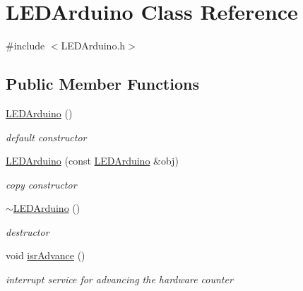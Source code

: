 \hypertarget{class_l_e_d_arduino}{}\section{L\+E\+D\+Arduino Class Reference}
\label{class_l_e_d_arduino}


{\ttfamily \#include $<$L\+E\+D\+Arduino.\+h$>$}

\subsection*{Public Member Functions}
\begin{DoxyCompactItemize}
\item 
\mbox{\label{class_l_e_d_arduino_a8f0a0b63342c171296c81f303787ccff}} 
\hyperlink{class_l_e_d_arduino_a8f0a0b63342c171296c81f303787ccff}{L\+E\+D\+Arduino} ()
\begin{DoxyCompactList}\small\item\em default constructor \end{DoxyCompactList}\item 
\hyperlink{class_l_e_d_arduino_a8ba91e5ee89fe89f9c1052f5619fc436}{L\+E\+D\+Arduino} (const \hyperlink{class_l_e_d_arduino}{L\+E\+D\+Arduino} \&obj)
\begin{DoxyCompactList}\small\item\em copy constructor \end{DoxyCompactList}\item 
\mbox{\label{class_l_e_d_arduino_a667ca90e4554f8efd6b050489a4b84c3}} 
\hyperlink{class_l_e_d_arduino_a667ca90e4554f8efd6b050489a4b84c3}{$\sim$\+L\+E\+D\+Arduino} ()
\begin{DoxyCompactList}\small\item\em destructor \end{DoxyCompactList}\item 
\mbox{\label{class_l_e_d_arduino_af612ff627d2ae8eedf6cdcec7ad1ac67}} 
void \hyperlink{class_l_e_d_arduino_af612ff627d2ae8eedf6cdcec7ad1ac67}{isr\+Advance} ()
\begin{DoxyCompactList}\small\item\em interrupt service for advancing the hardware counter \end{DoxyCompactList}\item 
\mbox{\label{class_l_e_d_arduino_a1b1d363f04adabc75cdc76a00fb3aa49}} 

\end{DoxyCompactItemize}
